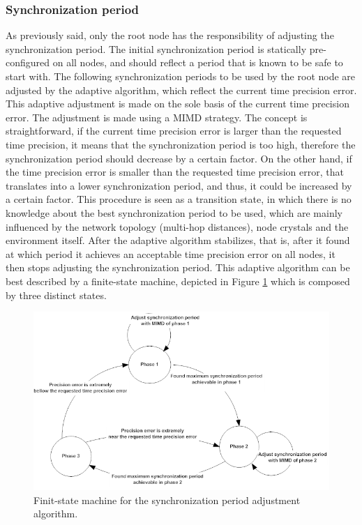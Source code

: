 \subsubsection{Synchronization period}
As previously said, only the root node has the responsibility of adjusting the synchronization period. The initial synchronization period is statically pre-configured on all nodes, and should reflect a period that is known to be safe to start with. The following synchronization periods to be used by the root node are adjusted by the adaptive algorithm, which reflect the current time precision error. This adaptive adjustment is made on the sole basis of the current time precision error. The adjustment is made using a \ac{MIMD} strategy. The concept is straightforward, if the current time precision error is larger than  the requested time precision, it means that the synchronization period is too high, therefore the synchronization period should decrease by a certain factor. On the other hand, if the time precision error is smaller than the requested time precision error, that translates into a lower synchronization period, and thus, it could be increased by a certain factor. This procedure is seen as a transition state, in which there is no knowledge about the best synchronization period to be used, which are mainly influenced by the network topology (multi-hop distances), node crystals and the environment itself. After the adaptive algorithm stabilizes, that is, after it found at which period it achieves an acceptable time precision error on all nodes, it then stops adjusting the synchronization period. This adaptive algorithm can be best described by a finite-state machine, depicted in Figure \ref{statemac}  which is composed by three distinct states. 

\begin{figure}[!htb]
\begin{center}
\includegraphics[scale=0.5]{./images/25-ttsp-machine_state.png}
\end{center}
\caption{Finit-state machine for the synchronization period adjustment algorithm.}
\label{statemac}
\end{figure}

